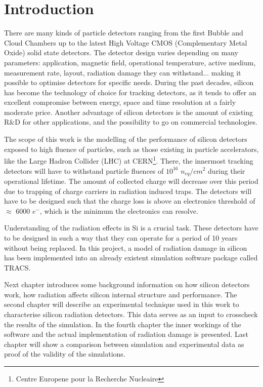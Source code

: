 \chapter{Introduction}

There are many kinds of particle detectors ranging from the first Bubble and Cloud Chambers up to the latest High Voltage CMOS (Complementary Metal Oxide) solid state detectors. The detector design varies depending on many parameters: application, magnetic field, operational temperature, active medium, measurement rate, layout, radiation damage they can withstand... making it possible to optimise detectors for specific needs. During the past decades, silicon has become the technology of choice for tracking detectors, as it tends to offer an excellent compromise between energy, space and time resolution at a fairly moderate price. Another advantage of silicon detectors is the amount of existing R\&D for other applications, and the possibility to go on commercial technologies.

 The scope of this work is the modelling of the performance of silicon detectors exposed to high fluence of particles, such as those existing in particle accelerators, like the Large Hadron Collider (LHC) at CERN\footnote{Centre Europene pour la Recherche Nucleaire}. There, the innermost tracking detectors will have to withstand particle fluences of $10^{16}$ $n_{eq}/cm^{2}$  during their operational lifetime. The amount of collected charge will decrease over this period due to trapping of charge carriers in radiation induced traps. The detectors will have to be designed such that the charge loss is above an electronics threshold of $\approx$ 6000 $e^{-}$, which is the minimum the electronics can resolve. 

 Understanding of the radiation effects in Si is a crucial task. These detectors have to be designed in such a way that they can operate for a period of 10 years without being replaced. In this project, a model of radiation damage in silicon has been implemented into an already existent simulation software package called TRACS. 
 
 Next chapter introduces some background information on how silicon detectors work, how radiation affects silicon internal structure and performance. The second chapter will describe an experimental technique used in this work to characterise silicon radiation detectors. This data serves as an input to crosscheck the results of the simulation. In the fourth chapter the inner workings of the software and the actual implementation of radiation damage is presented. Last chapter will show a comparison between simulation and experimental data as proof of the validity of the simulations. 

